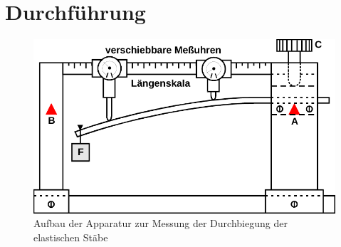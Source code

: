 \section{Durchführung}
\label{sec:Durchführung}




\begin{figure}
    \centering
    \includegraphics{content/Messapparat.pdf}
    \caption{Aufbau der Apparatur zur Messung der Durchbiegung der elastischen Stäbe}
    \label{fig:Messapparatur}
  \end{figure}